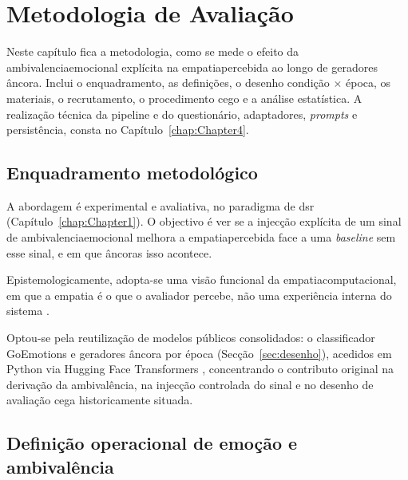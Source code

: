 
\chapter{Metodologia de Avaliação}
\label{chap:Chapter3}

Neste capítulo fica a metodologia, como se mede o efeito da \gls{ambivalenciaemocional} explícita na \gls{empatiapercebida} ao longo de geradores âncora. Inclui o enquadramento, as definições, o desenho condição \(\times\) época, os materiais, o recrutamento, o procedimento cego e a análise estatística. A realização técnica da pipeline e do questionário, adaptadores, \textit{prompts} e persistência, consta no Capítulo~\ref{chap:Chapter4}.


\section{Enquadramento metodológico}
\label{sec:enquadramento}

A abordagem é experimental e avaliativa, no paradigma de \gls{dsr} (Capítulo~\ref{chap:Chapter1}). O objectivo é ver se a injecção explícita de um sinal de \gls{ambivalenciaemocional} melhora a \gls{empatiapercebida} face a uma \textit{baseline} sem esse sinal, e em que âncoras isso acontece.

Epistemologicamente, adopta-se uma visão funcional da \gls{empatiacomputacional}, em que a empatia é o que o avaliador percebe, não uma experiência interna do sistema \parencite{Rashkin2019Empathy, Sharma2020Empathy}.

Optou-se pela reutilização de modelos públicos consolidados: o classificador GoEmotions \parencite{Demszky2020GoEmotions} e geradores âncora por época (Secção~\ref{sec:desenho}), acedidos em Python via Hugging Face Transformers \parencite{Wolf2020Transformers}, concentrando o contributo original na derivação da ambivalência, na injecção controlada do sinal e no desenho de avaliação cega historicamente situada.


\section{Definição operacional de emoção e ambivalência}
\label{sec:definicao}


